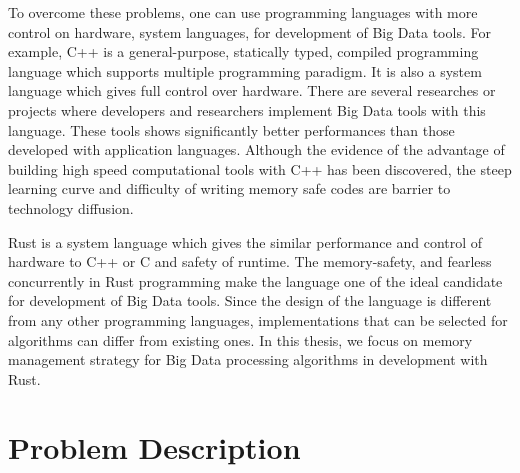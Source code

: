 To overcome these problems, one can use programming languages with more control on hardware, system languages, for development of Big Data tools. For example, C++ is a general-purpose, statically typed, 
compiled programming language which supports multiple programming paradigm. It is also a system language which gives full control over hardware. 
There are several researches or projects \cite{DBLP:conf/sigmod/0001BLLMSTYJ18} where developers and 
researchers implement Big Data tools with this language. These tools shows significantly better performances than those developed with application languages. 
Although the evidence of the advantage of building high speed computational tools with C++ has been discovered, the steep learning curve and difficulty of writing memory safe codes are barrier to technology diffusion.

Rust is a system language which gives the similar performance and control of hardware to C++ or C and safety of runtime. The memory-safety, and fearless concurrently in Rust programming 
make the language one of the ideal candidate for development of Big Data tools. 
Since the design of the language is different from any other programming languages, implementations that can be selected for algorithms can differ from existing ones.
In this thesis, we focus on memory management strategy for Big Data processing algorithms in development with Rust. 


\section{Problem Description}
\label{sec:probdesc}



